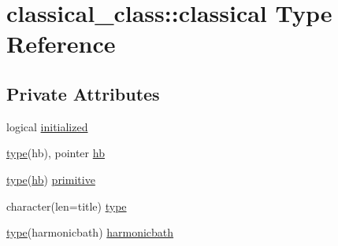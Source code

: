 \hypertarget{structclassical__class_1_1classical}{\section{classical\-\_\-class\-:\-:classical Type Reference}
\label{structclassical__class_1_1classical}
}
\subsection*{Private Attributes}
\begin{DoxyCompactItemize}
\item 
logical \hyperlink{structclassical__class_1_1classical_a5f61e82b2e7ad767b39cea9512cd1e79}{initialized}
\item 
\hyperlink{structclassical__class_1_1classical_a4c835c43f9359c512790ebce83387d63}{type}(hb), pointer \hyperlink{structclassical__class_1_1classical_a1b460aa0f46813107d5d6b2c6904b714}{hb}
\item 
\hyperlink{structclassical__class_1_1classical_a4c835c43f9359c512790ebce83387d63}{type}(\hyperlink{structclassical__class_1_1classical_a1b460aa0f46813107d5d6b2c6904b714}{hb}) \hyperlink{structclassical__class_1_1classical_ae02517eaafa051141de41d949d7be0ef}{primitive}
\item 
character(len=title) \hyperlink{structclassical__class_1_1classical_a4c835c43f9359c512790ebce83387d63}{type}
\item 
\hyperlink{structclassical__class_1_1classical_a4c835c43f9359c512790ebce83387d63}{type}(harmonicbath) \hyperlink{structclassical__class_1_1classical_a36ea44d91c4d0b5dd920ba9099be4ceb}{harmonicbath}
\end{DoxyCompactItemize}


